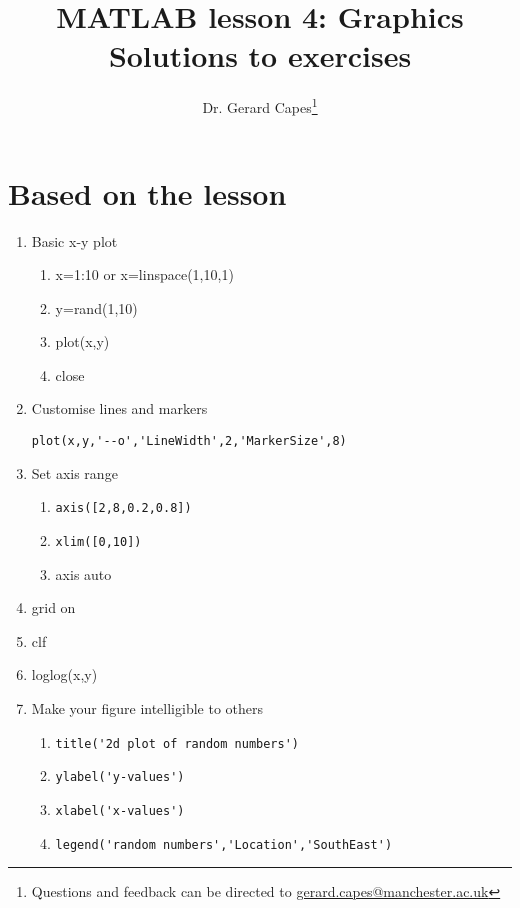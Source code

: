 \documentclass[a4paper]{article}
\title{MATLAB lesson 4: Graphics\\Solutions to exercises}
\date{}
\author{Dr. Gerard Capes\thanks{Questions and feedback can be directed to \href{mailto:gerard.capes@manchester.ac.uk?subject=Feedback on MATLAB lesson 4 (plotting) solution sheet}{gerard.capes@manchester.ac.uk}}}
\begin{document}
\maketitle


\section{Based on the lesson}

\begin{enumerate}
	\item Basic x-y plot
	\begin{enumerate}
		\item x=1:10 or x=linspace(1,10,1)
		\item y=rand(1,10)
		\item plot(x,y)
		\item close
	\end{enumerate}
	
	\item Customise lines and markers
	
	\lstinline[style=Matlab-editor]!plot(x,y,'--o','LineWidth',2,'MarkerSize',8)!
	
	\item Set axis range
	\begin{enumerate}
	
		\item \lstinline[style=Matlab-editor]!axis([2,8,0.2,0.8])!
		\item \lstinline[style=Matlab-editor]!xlim([0,10])!
		\item axis auto
	\end{enumerate}
	
	\item grid on
	\item clf
	\item loglog(x,y)
	
	\item Make your figure intelligible to others
	\begin{enumerate}
		\item 	\lstinline[style=Matlab-editor]!title('2d plot of random numbers')!
		\item 	\lstinline[style=Matlab-editor]!ylabel('y-values')!
		\item 	\lstinline[style=Matlab-editor]!xlabel('x-values')!
		\item 	\lstinline[style=Matlab-editor]!legend('random numbers','Location','SouthEast')!
	\end{enumerate}
	

\end{enumerate}
\end{document}
